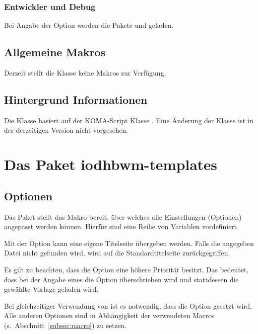\documentclass[babel=ngerman,highlight=false]{skdoc}
\begin{document}
            \subsubsection{Entwickler und Debug}
                Bei Angabe der Option werden die Pakete  und  geladen.

        \subsection{Allgemeine Makros}
            Derzeit stellt die Klasse keine Makros zur Verfügung.
            
        \subsection{Hintergrund Informationen}
            Die Klasse basiert auf der KOMA-Script Klasse . Eine Änderung der Klasse ist in der derzeitigen Version \theversion{} nicht vorgesehen.

    \section{Das Paket iodhbwm-templates}\label{pkg:iodhbwm-templates}
        \subsection{Optionen}\label{pkg:options}
            Das Paket stellt das Makro \Macro{} bereit, über welches alle Einstellungen (Optionen) angepasst werden können. Hierfür sind eine Reihe von  Variablen vordefiniert.\medskip
            
            Mit der Option kann eine eigene Titelseite übergeben werden. Falls die angegeben Datei nicht gefunden wird, wird auf die Standardtitelseite zurückgegriffen.
            
            Es gilt zu beachten, dass die Option  eine höhere Priorität besitzt. Das bedeutet, dass bei der Angabe eines  die Option  überschrieben wird und stattdessen die gewählte Vorlage geladen wird.
            
            Bei gleichzeitiger Verwendung von  ist es notwendig, dass die Option  gesetzt wird. Alle anderen Optionen sind in Abhängigkeit der verwendeten Macros (s.~Abschnitt~\ref{subsec:macro}) zu setzen.\medskip
            
\end{document}
